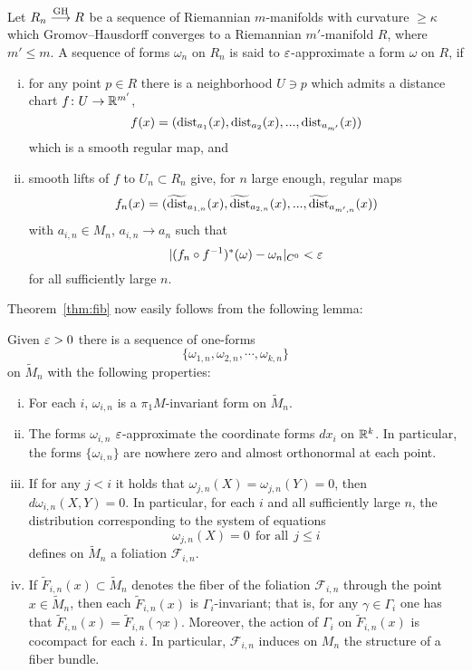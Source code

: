 \documentclass{amsart}
\begin{document}
\begin{defn}\label{def:close}
Let $R_n\GHto R$ be a sequence of Riemannian $m$-manifolds
with curvature $\ge \kappa$ which Gromov--Hausdorff converges
to a Riemannian $m'$-manifold $R$, where $m'\le m$.
A sequence of forms $\omega_n$ on $R_n$ is said to
$\varepsilon$-approximate a form $\omega$ on $R$,
if
\begin{enumerate}[(i)]
\item
for any point $p\in R$ there is a neighborhood $U\ni p$
which admits a distance chart $f\colon U\to {\Bbb R}^{m'}$,
$$f(x)=(\operatorname{\rm dist}_{a_1}(x),\operatorname{\rm dist}_{a_2}(x),...,\operatorname{\rm dist}_{a_{m'}}(x))$$
which is a smooth regular map,
and

\item
smooth lifts of $f$ to $U_n\subset R_n$
give, for $n$ large enough, regular maps
$$f_n(x)=(\widetilde{\operatorname{\rm dist}}_{a_{1,n}}(x),\widetilde{\operatorname{\rm dist}}_{a_{2,n}}(x),...,
\widetilde{\operatorname{\rm dist}}_{a_{m',n}}(x))$$
with $a_{i,n}\in M_n$, $a_{i,n}\to a_{n}$
such that
$$|(f_n\circ f^{-1})^*(\omega)-\omega_n|_{C^{0}}<\varepsilon$$
for all sufficiently large $n$.

\end{enumerate}

\end{defn}

Theorem~\ref{thm:fib} now easily follows from the following lemma:

\begin{lem}
Given $\varepsilon>0$ there is a sequence of one-forms
$$\{\omega_{1,n},\omega_{2,n},\cdots,\omega_{k,n}\}$$
on $\tilde M_n$
with the following properties:
\begin{enumerate}[(i)]
\item For each $i$, $\omega_{i,n}$ is a $\pi_1M$-invariant form on $\tilde M_n$.
\item The forms $\omega_{i,n}$ $\varepsilon$-approximate
the coordinate forms $dx_i$ on ${\Bbb R}^k$.
In particular, the forms $\{\omega_{i,n}\}$ are nowhere zero
and almost orthonormal at each point.
\item
If for any $j<i$ it holds that
$\omega_{j,n}(X)=\omega_{j,n}(Y)=0$, then $d\omega_{i,n}(X,Y)=0$.
In particular,
for each $i$ and all sufficiently large $n$,
the distribution corresponding to the system of equations
$$\omega_{j,n}(X)=0 \ \ \text{for all}\ \  j\le i$$
defines  on $\tilde M_n$ a foliation $\mathcal F_{i,n}$.

\item
If $\tilde F_{i,n}(x)\subset \tilde M_n$ denotes
the fiber of the foliation $\mathcal F_{i,n}$ through the point $x\in \tilde M_n$,
then each $\tilde F_{i,n}(x)$ is $\Gamma_i$-invariant;
that is,  for any $\gamma\in \Gamma_i$
one has that $\tilde F_{i,n}(x)=\tilde F_{i,n}(\gamma x)$.
 Moreover, the action of $\Gamma_i$ on $\tilde F_{i,n}(x)$ is cocompact
for each $i$. In particular, $\mathcal F_{i,n}$ induces on $M_n$
the structure of a fiber bundle.
\end{enumerate}
\end{lem}
\end{document}
